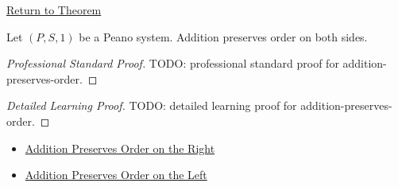 \newpage
{}
\label{prf:addition-preserves-order}

\begin{remark*}[Return]
\hyperref[thm:addition-preserves-order]{Return to Theorem}
\end{remark*}

\begin{theorem*}
Let $(P,S,1)$ be a Peano system. Addition preserves order on both sides.
\end{theorem*}

\begin{proof}[Professional Standard Proof]
\LRAProofBodyStart
TODO: professional standard proof for addition-preserves-order.
\end{proof}

\begin{proof}[Detailed Learning Proof]
\LRAProofBodyStart
TODO: detailed learning proof for addition-preserves-order.
\end{proof}

\begin{remark*}
\end{remark*}

\begin{dependencies}
\begin{itemize}
  \item \hyperref[thm:addition-preserves-order-on-right]{Addition Preserves Order on the Right}
  \item \hyperref[thm:addition-preserves-order-on-left]{Addition Preserves Order on the Left}
\end{itemize}
\end{dependencies}

\clearpage
